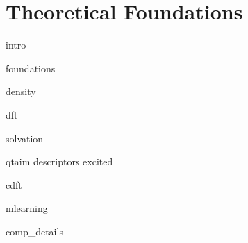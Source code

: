 \chapter{Theoretical Foundations}

\vspace{3cm}%
{intro}
\newpage

{foundations}

{density}

{dft}

{solvation}

{qtaim}
{descriptors}
{excited}

{cdft}

{mlearning}

{comp_details}

